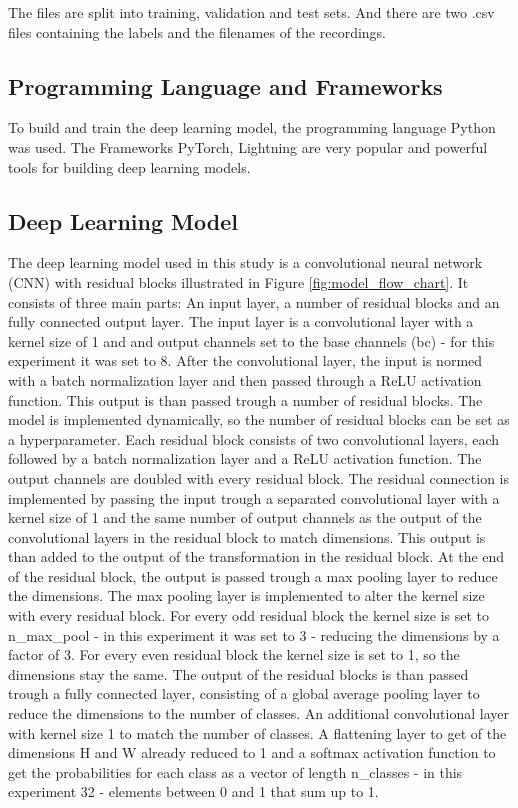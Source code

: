 The files are split into training, validation and test sets. And there are two .csv files containing
the labels and the filenames of the recordings.


\subsection{Programming Language and Frameworks}
To build and train the deep learning model, the programming language Python was used.
The Frameworks PyTorch, Lightning are very popular and powerful tools for building deep learning models.

\subsection{Deep Learning Model}

The deep learning model used in this study is a convolutional neural network (CNN) with residual blocks
illustrated in Figure \ref{fig:model_flow_chart}. It consists of three main parts: An input layer,
a number of residual blocks and an fully connected output layer. The input layer is a convolutional layer with a kernel
size of 1 and and output channels set to the base channels (bc) - for this experiment it was set to 8.
After the convolutional layer, the input is normed with a batch normalization layer and then passed through
a ReLU activation function. This output is than passed trough a number of residual blocks. The model is
implemented dynamically, so the number of residual blocks can be set as a hyperparameter. Each residual block
consists of two convolutional layers, each followed by a batch normalization layer and a ReLU activation function.
The output channels are doubled with every residual block.
The residual connection is implemented by passing the input trough a separated convolutional layer with a kernel size of 1
and the same number of output channels as the output of the convolutional layers in the residual block to
match dimensions. This output is than added to the output of the transformation in the residual block.
At the end of the residual block, the output is passed trough a max pooling layer to reduce the dimensions.
The max pooling layer is implemented to alter the kernel size with every residual block. For every odd residual block
the kernel size is set to n\_max\_pool - in this experiment it was set to 3 - reducing the dimensions by a factor of 3.
For every even residual block the kernel size is set to 1, so the dimensions stay the same. The output of the residual blocks
is than passed trough a fully connected layer, consisting of a 
global average pooling layer to reduce the dimensions to the number of classes. An additional
convolutional layer with kernel size 1 to match the number of classes. A flattening layer to get of the dimensions H and W
already reduced to 1 and a softmax activation function to get the probabilities for each class as a vector of length n\_classes
- in this experiment 32 - elements between 0 and 1 that sum up to 1.

